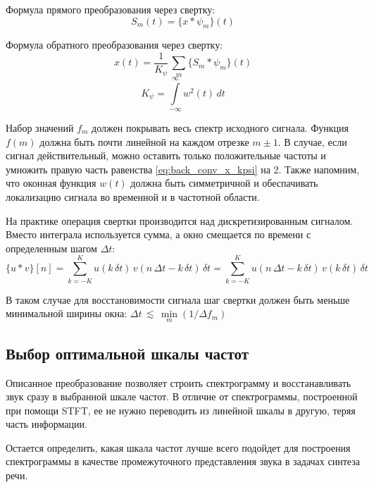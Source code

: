 Формула прямого преобразования через свертку:
\begin{equation}
  S_m(t) = \{x * \psi_m\}(t)
\end{equation}

Формула обратного преобразования через свертку:
\begin{equation}
  x(t) = \frac{1}{K_{\psi}} \, \sum \limits_m \{S_m * \psi_m\}(t)
  \label{eq:back_conv_x_kpsi}
\end{equation}
\begin{equation}
  K_{\psi} = \int \limits_{-\infty}^\infty w^2(t) \, dt
\end{equation}

Набор значений $f_m$ должен покрывать весь спектр исходного сигнала. Функция $f(m)$ должна быть почти линейной на каждом отрезке $m \pm 1$.
В случае, если сигнал действительный, можно оставить только положительные частоты и умножить правую часть равенства \ref{eq:back_conv_x_kpsi} на 2.
Также напомним, что оконная функция $w(t)$ должна быть симметричной и обеспачивать локализацию сигнала во временной и в частотной области.

На практике операция свертки производится над дискретизированным сигналом. Вместо интеграла используется сумма, 
а окно смещается по времени с определенным шагом $\Delta t$:
\begin{equation}
  \{u*v\}[n] = 
  \sum \limits_{ k = -K }^{ K } u( k\,\delta t ) \, v( n\,\Delta t - k\,\delta t ) \, \delta t = 
  \sum \limits_{ k = -K }^{ K } u( n\,\Delta t - k\,\delta t ) \, v( k\,\delta t ) \, \delta t
\end{equation}

В таком случае для восстановимости сигнала шаг свертки должен быть меньше минимальной ширины окна: 
$ \Delta t \, \lesssim \, \min \limits_m (1/\Delta f_m) $


\subsection{Выбор оптимальной шкалы частот}

Описанное преобразование позволяет строить спектрограмму и восстанавливать звук сразу в выбранной шкале частот. 
В отличие от спектрограммы, построенной при помощи STFT, 
ее не нужно переводить из линейной шкалы в другую, теряя часть информации. 

Остается определить, какая шкала частот лучше всего подойдет для построения спектрограммы 
в качестве промежуточного представления звука в задачах синтеза речи.

